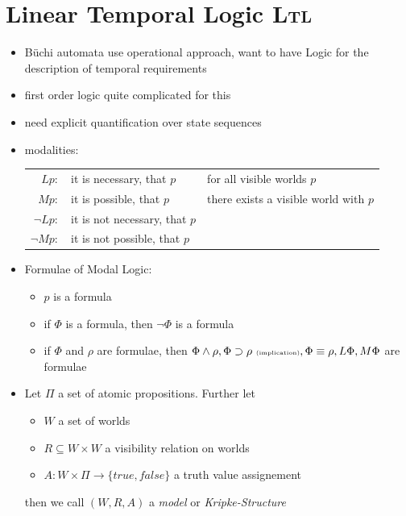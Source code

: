 \documentclass[a4paper, 10pt]{article}
\begin{document}
\section*{Linear Temporal Logic \textsc{Ltl}}
\begin{itemize}
    \item Büchi automata use operational approach, want to have Logic for the description of temporal requirements
    \item first order logic quite complicated for this
    \item[\follows] need explicit quantification over state sequences
    \item modalities:
    \begin{tabular}[t]{rll}
    $Lp:$ & it is necessary, that $p$ & {\tiny for all visible worlds $p$}\\
    $Mp:$ & it is possible, that $p$ & {\tiny there exists a visible world with $p$}\\
    $\neg Lp:$ & it is not necessary, that $p$ & %
    \\
    $\neg Mp:$ & it is not possible, that $p$ & %
    \end{tabular}
    \item Formulae of Modal Logic:
    \begin{itemize}
        \item $p$ is a formula
        \item if $\Phi$ is a formula, then $\neg\Phi$ is a formula
        \item if $\Phi$ and $\rho$ are formulae, then $\Phi\wedge\rho, \Phi\supset\rho \textrm{ \tiny (implication)}, \Phi\equiv\rho, L\Phi, M\Phi$ are formulae
    \end{itemize}
    \item \begin{shaded}
        Let $\Pi$ a set of atomic propositions. Further let
        \begin{itemize}
            \item $W$ a set of worlds
            \item $R\subseteq W\times W$ a visibility relation on worlds
            \item $A: W\times\Pi\to \{true,false\}$ a truth value assignement
        \end{itemize}
        then we call $(W,R,A)$ a \emph{model} or \emph{Kripke-Structure}
    \end{shaded}
\end{itemize}
\end{document}
